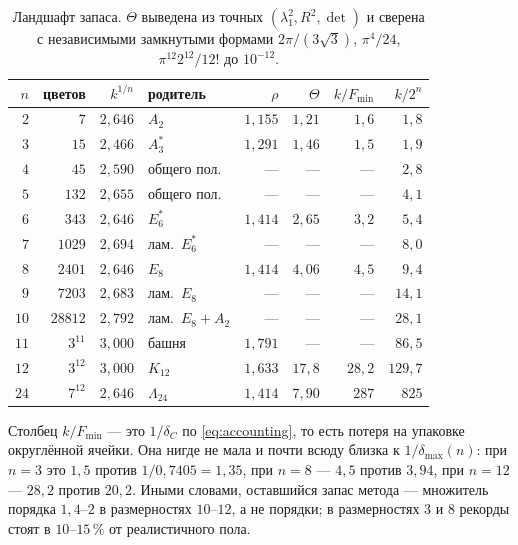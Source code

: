 \begin{table}[htbp]
\centering
\caption{Ландшафт запаса. $\Theta$ выведена из точных
$(\lambda_1^2,R^2,\det)$ и сверена с независимыми замкнутыми формами
$2\pi/(3\sqrt3)$, $\pi^4/24$, $\pi^{12}2^{12}/12!$ до $10^{-12}$.}
\label{tab:landscape}
\begin{tabular}{@{}rrrlrrrr@{}}
\toprule
$n$ & цветов & $k^{1/n}$ & родитель & $\rho$ & $\Theta$ & $k/F_{\min}$ & $k/2^n$\\
\midrule
$2$  & $7$          & $2{,}646$ & $A_2$          & $1{,}155$ & $1{,}21$ & $1{,}6$ & $1{,}8$\\
$3$  & $15$         & $2{,}466$ & $A_3^*$        & $1{,}291$ & $1{,}46$ & $1{,}5$ & $1{,}9$\\
$4$  & $45$         & $2{,}590$ & общего пол.    & ---       & ---      & ---     & $2{,}8$\\
$5$  & $132$        & $2{,}655$ & общего пол.    & ---       & ---      & ---     & $4{,}1$\\
$6$  & $343$        & $2{,}646$ & $E_6^*$        & $1{,}414$ & $2{,}65$ & $3{,}2$ & $5{,}4$\\
$7$  & $1029$       & $2{,}694$ & лам.\ $E_6^*$  & ---       & ---      & ---     & $8{,}0$\\
$8$  & $2401$       & $2{,}646$ & $E_8$          & $1{,}414$ & $4{,}06$ & $4{,}5$ & $9{,}4$\\
$9$  & $7203$       & $2{,}683$ & лам.\ $E_8$    & ---       & ---      & ---     & $14{,}1$\\
$10$ & $28812$      & $2{,}792$ & лам.\ $E_8{+}A_2$ & ---    & ---      & ---     & $28{,}1$\\
$11$ & $3^{11}$     & $3{,}000$ & башня          & $1{,}791$ & ---      & ---     & $86{,}5$\\
$12$ & $3^{12}$     & $3{,}000$ & $K_{12}$       & $1{,}633$ & $17{,}8$ & $28{,}2$& $129{,}7$\\
$24$ & $7^{12}$     & $2{,}646$ & $\Lambda_{24}$ & $1{,}414$ & $7{,}90$ & $287$   & $825$\\
\bottomrule
\end{tabular}
\end{table}

Столбец $k/F_{\min}$ --- это $1/\delta_C$ по \eqref{eq:accounting}, то есть
потеря на упаковке округлённой ячейки. Она нигде не мала и почти всюду близка к
$1/\delta_{\max}(n)$: при $n=3$ это $1{,}5$ против $1/0{,}7405=1{,}35$, при
$n=8$ --- $4{,}5$ против $3{,}94$, при $n=12$ --- $28{,}2$ против $20{,}2$. Иными
словами, оставшийся запас метода --- множитель порядка $1{,}4$--$2$ в
размерностях $10$--$12$, а не порядки; в размерностях $3$ и $8$ рекорды стоят в
$10$--$15\,\%$ от реалистичного пола.

